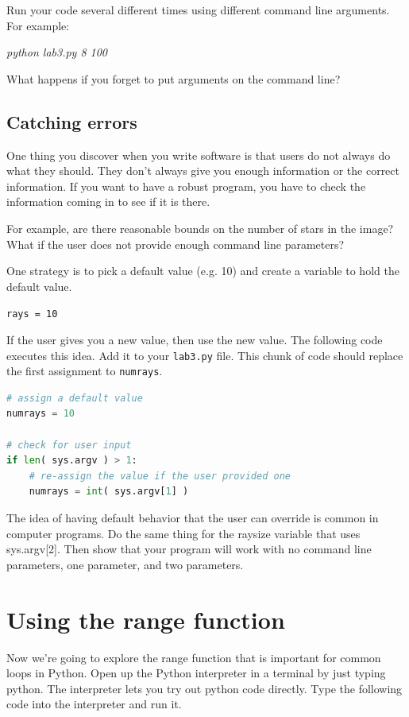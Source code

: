 \documentclass[12pt]{article}
\begin{document}
Run your code several different times using different command line arguments. For example:

\vspace{0.5cm}
\textit{python lab3.py 8 100}
\vspace{5mm}

What happens if you forget to put arguments on the command line?

\subsection{Catching errors}
One thing you discover when you write software is that users do not always do what they should. They don't always give you enough information or the correct information. If you want to have a robust program, you have to check the information coming in to see if it is there.

For example, are there reasonable bounds on the number of stars in the image? What if the user does not provide enough command line parameters?

One strategy is to pick a default value (e.g. 10) and create a variable to hold the default value.

\vspace{5mm}
\texttt{rays = 10}
\vspace{5mm}

If the user gives you a new value, then use the new value. The following code executes this idea. Add it to your \texttt{lab3.py} file. This chunk of code should replace the first assignment to \texttt{numrays}.
\begin{lstlisting}[language=Python]
# assign a default value
numrays = 10

# check for user input
if len( sys.argv ) > 1:
    # re-assign the value if the user provided one
    numrays = int( sys.argv[1] )
\end{lstlisting}
The idea of having default behavior that the user can override is common in computer programs. Do the same thing for the raysize variable that uses sys.argv[2]. Then show that your program will work with no command line parameters, one parameter, and two parameters.

\section{Using the range function}
Now we're going to explore the range function that is important for common loops in Python. Open up the Python interpreter in a terminal by just typing python. The interpreter lets you try out python code directly. Type the following code into the interpreter and run it.
\end{document}
